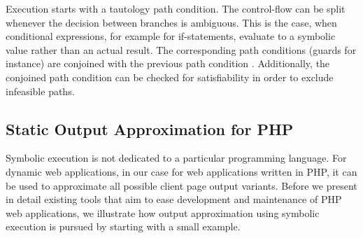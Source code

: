 \documentclass[sigconf]{acmart}
\begin{document}
Execution starts with a tautology path
condition. The control-flow can be split whenever the decision between branches
is ambiguous. This is the case, when conditional expressions, for example for
if-statements, evaluate to a symbolic value rather than an actual result.
The corresponding path conditions (guards for instance) are conjoined with the
previous path condition \cite{King1976}. Additionally, the conjoined path
condition can be checked for satisfiability in order to exclude infeasible
paths. 


\subsection{Static Output Approximation for PHP} \label{sec:workflow}
Symbolic execution is not dedicated to a particular
programming language. For dynamic web applications, in our case for web
applications written in PHP, it can be used to approximate all possible client
page output variants. Before we present in detail existing tools that aim to
ease development and maintenance of PHP web applications, we illustrate how output
approximation using symbolic execution is pursued by starting with a small
example.
\end{document}
